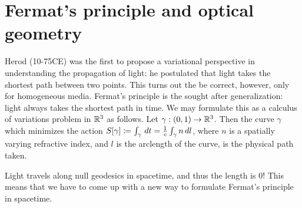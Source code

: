 \section{Fermat's principle and optical geometry}
Herod (10-75CE) was the first to propose a variational perspective in understanding the propagation of light: he postulated that light takes the shortest path between two points.
This turns out the be correct, however, only for homogeneous media.
Fermat's principle is the sought after generalization: light always takes the shortest path in time.
We may formulate this as a calculus of variations problem in $\mathbb{R}^3$ as follows.
Let $\gamma: (0,1) \to \mathbb{R}^3$.
Then the curve $\gamma$ which minimizes the action $S[\gamma] \coloneqq \int_{\gamma} \, dt = \frac{1}{c}\int_{\gamma} n \, dl$, where $n$ is a spatially varying refractive index, and $l$ is the arclength of the curve, is the physical path taken.
\begin{remark}[]\label{}
Light travels along null geodesics in spacetime, and thus the length is $0$! This means that we have to come up with a new way to formulate Fermat's principle in spacetime.
\end{remark}
%
%
%
%
%
